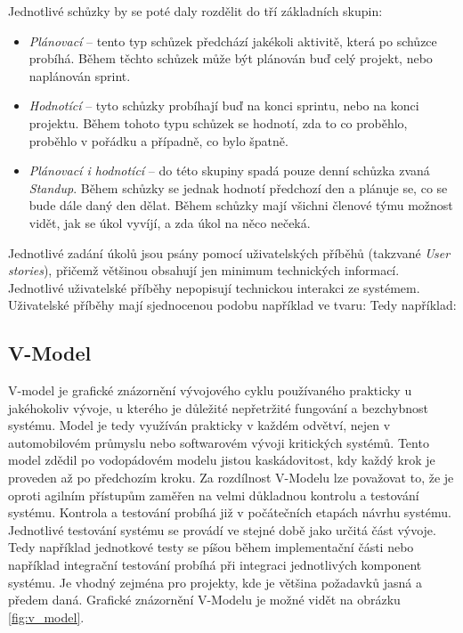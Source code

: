 \documentclass[czech,master,public,dept460,male,cpdeclaration,oneside]{diploma}
\begin{document}
Jednotlivé schůzky by se poté daly rozdělit do tří základních skupin:

\begin{itemize}
\item \textit{Plánovací} -- tento typ schůzek předchází jakékoli aktivitě, která po schůzce probíhá. Během těchto schůzek může být plánován buď celý projekt, nebo naplánován sprint.
\item \textit{Hodnotící} -- tyto schůzky probíhají buď na konci sprintu, nebo na konci projektu. Během tohoto typu schůzek se hodnotí, zda to co proběhlo, proběhlo v pořádku a případně, co bylo špatně. 
\item \textit{Plánovací i hodnotící} -- do této skupiny spadá pouze denní schůzka zvaná \textit{Standup}. Během schůzky se jednak hodnotí předchozí den a plánuje se, co se bude dále daný den dělat. Během schůzky mají všichni členové týmu možnost vidět, jak se úkol vyvíjí, a zda úkol na něco nečeká.
\end{itemize}


Jednotlivé zadání úkolů jsou psány pomocí uživatelských příběhů (takzvané \textit{User stories}), přičemž většinou obsahují jen minimum technických informací. Jednotlivé uživatelské příběhy nepopisují technickou interakci ze systémem. Uživatelské příběhy mají  sjednocenou podobu například ve tvaru:  Tedy například:  \cite{ref:scrum_myslin_us}

\subsection{V-Model}
V-model je grafické znázornění vývojového cyklu používaného prakticky u jakéhokoliv vývoje, u kterého je důležité nepřetržité fungování a bezchybnost systému. Model je tedy využíván prakticky v každém odvětví, nejen v automobilovém průmyslu nebo softwarovém vývoji kritických systémů. Tento model zdědil po vodopádovém modelu jistou kaskádovitost, kdy každý krok je proveden až po předchozím kroku. Za rozdílnost V-Modelu lze považovat to, že je oproti agilním přístupům zaměřen na velmi důkladnou kontrolu a testování systému. Kontrola a testování probíhá již v počátečních etapách návrhu systému. Jednotlivé testování systému se provádí ve stejné době jako určitá část vývoje. Tedy například jednotkové testy se píšou během implementační části nebo například integrační testování probíhá při integraci jednotlivých komponent systému. Je vhodný zejména pro projekty, kde je většina požadavků jasná a předem daná. Grafické znázornění V-Modelu je možné vidět na obrázku \ref{fig:v_model}.
\end{document}
